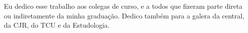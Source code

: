 Eu dedico esse trabalho aos colegas de curso, e a todos que fizeram parte direta ou indiretamente da minha graduação. Dedico também para a galera da central, da CJR, do TCU e da Estudologia.